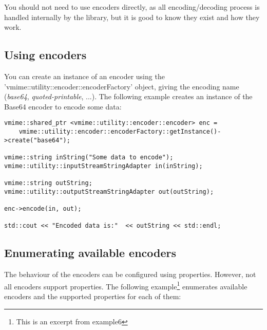 You should not need to use encoders directly, as all encoding/decoding
process is handled internally by the library, but it is good to know
they exist and how they work.

\subsection{Using encoders} %

You can create an instance of an encoder using the 'vmime::utility::encoder::encoderFactory'
object, giving the encoding name ({\it base64}, {\it quoted-printable}, ...).
The following example creates an instance of the Base64 encoder to encode
some data:

\begin{lstlisting}[caption={A simple example of using an encoder}]
vmime::shared_ptr <vmime::utility::encoder::encoder> enc =
    vmime::utility::encoder::encoderFactory::getInstance()->create("base64");

vmime::string inString("Some data to encode");
vmime::utility::inputStreamStringAdapter in(inString);

vmime::string outString;
vmime::utility::outputStreamStringAdapter out(outString);

enc->encode(in, out);

std::cout << "Encoded data is:"  << outString << std::endl;
\end{lstlisting}

\subsection{Enumerating available encoders} %

The behaviour of the encoders can be configured using properties. However,
not all encoders support properties. The following example\footnote{This is
an excerpt from {\vexample example6}} enumerates available encoders and the
supported properties for each of them:

